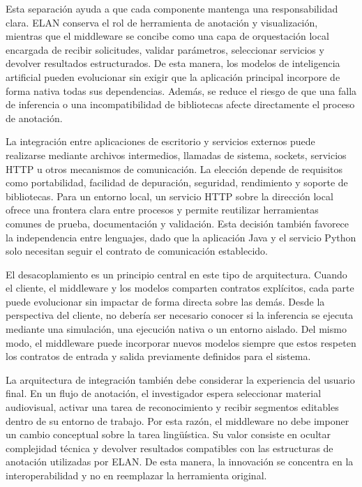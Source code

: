 Esta separación ayuda a que cada componente mantenga una responsabilidad clara. ELAN conserva el rol de herramienta de anotación y visualización, mientras que el middleware se concibe como una capa de orquestación local encargada de recibir solicitudes, validar parámetros, seleccionar servicios y devolver resultados estructurados. De esta manera, los modelos de inteligencia artificial pueden evolucionar sin exigir que la aplicación principal incorpore de forma nativa todas sus dependencias. Además, se reduce el riesgo de que una falla de inferencia o una incompatibilidad de bibliotecas afecte directamente el proceso de anotación.

La integración entre aplicaciones de escritorio y servicios externos puede realizarse mediante archivos intermedios, llamadas de sistema, sockets, servicios HTTP u otros mecanismos de comunicación. La elección depende de requisitos como portabilidad, facilidad de depuración, seguridad, rendimiento y soporte de bibliotecas. Para un entorno local, un servicio HTTP sobre la dirección local ofrece una frontera clara entre procesos y permite reutilizar herramientas comunes de prueba, documentación y validación. Esta decisión también favorece la independencia entre lenguajes, dado que la aplicación Java y el servicio Python solo necesitan seguir el contrato de comunicación establecido.

El desacoplamiento es un principio central en este tipo de arquitectura. Cuando el cliente, el middleware y los modelos comparten contratos explícitos, cada parte puede evolucionar sin impactar de forma directa sobre las demás. Desde la perspectiva del cliente, no debería ser necesario conocer si la inferencia se ejecuta mediante una simulación, una ejecución nativa o un entorno aislado. Del mismo modo, el middleware puede incorporar nuevos modelos siempre que estos respeten los contratos de entrada y salida previamente definidos para el sistema.

La arquitectura de integración también debe considerar la experiencia del usuario final. En un flujo de anotación, el investigador espera seleccionar material audiovisual, activar una tarea de reconocimiento y recibir segmentos editables dentro de su entorno de trabajo. Por esta razón, el middleware no debe imponer un cambio conceptual sobre la tarea lingüística. Su valor consiste en ocultar complejidad técnica y devolver resultados compatibles con las estructuras de anotación utilizadas por ELAN. De esta manera, la innovación se concentra en la interoperabilidad y no en reemplazar la herramienta original.

